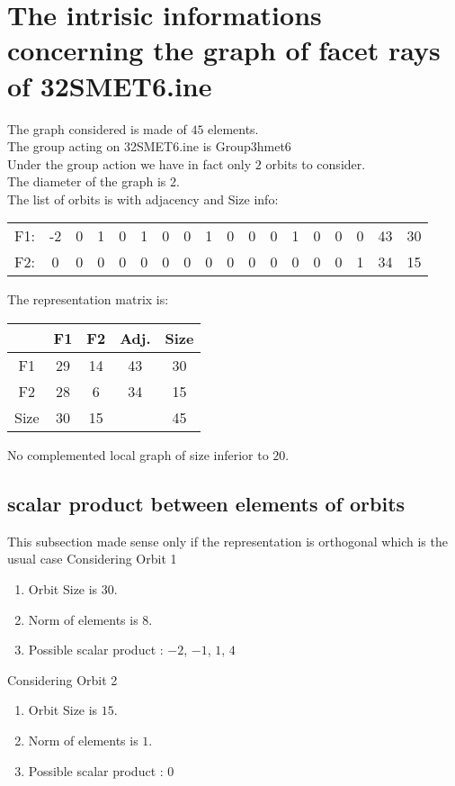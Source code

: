 \documentclass[12pt]{article}
\begin{document}
\section{The intrisic informations concerning the graph of facet rays of 32SMET6.ine}
The graph considered is made of $45$ elements.\\
The group acting on 32SMET6.ine is Group3hmet6\\
Under the group action we have in fact only $2$ orbits to consider.\\
The diameter of the graph is $2$.\\
The list of orbits is with adjacency and Size info:
\begin{center}
\scriptsize
\begin{tabular}{cccccccccccccccc|c|c}
F1:&-2&0&1&0&1&0&0&1&0&0&0&1&0&0&0&43&30\\
F2:&0&0&0&0&0&0&0&0&0&0&0&0&0&0&1&34&15\\
\end{tabular}
\end{center}
The representation matrix is:
\begin{center}
\scriptsize
\begin{tabular}{|c|cc|c|c|}
\hline
&F1&F2&Adj.&Size\\
\hline
F1& 29& 14&43&30\\
F2& 28& 6&34&15\\
\hline
Size&30&15&&45\\
\hline
\end{tabular}
\end{center}
No complemented local graph of size inferior to $20$.
\subsection{scalar product between elements of orbits}
\noindent This subsection made sense only if the representation is orthogonal which is the usual case
Considering Orbit 1
\begin{enumerate}
\item Orbit Size is $30$.
\item Norm of elements is $8$.
\item Possible scalar product : $-2$, $-1$, $1$, $4$
\end{enumerate}
Considering Orbit 2
\begin{enumerate}
\item Orbit Size is $15$.
\item Norm of elements is $1$.
\item Possible scalar product : $0$
\end{enumerate}
\end{document}
